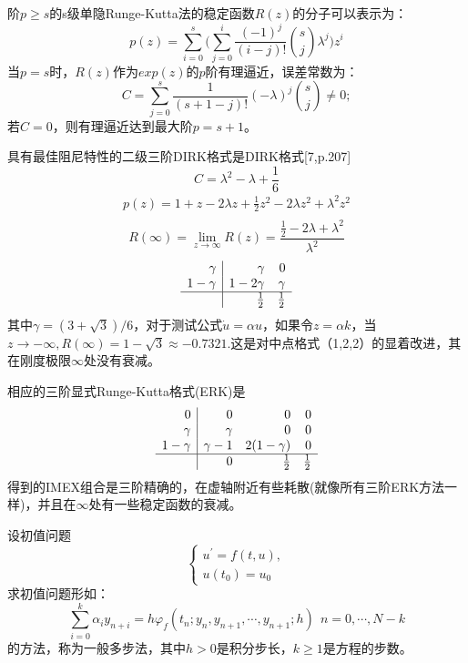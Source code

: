 \documentclass[12pt,a4paper]{article}
\numberwithin{equation}{section}
\begin{document}
阶$p\ge s$的s级单隐Runge-Kutta法的稳定函数$R(z)$的分子可以表示为：
\begin{equation*}
p(z)=\sum_{i=0}^{s}\bigg(\sum_{j=0}^{i}\frac{(-1)^j}{(i-j)!}\binom{s}{j}\lambda^j\biggl)z^i
\end{equation*}
当$p=s$时，$R(z)$作为$exp(z)$的$p$阶有理逼近，误差常数为：
\begin{equation*}
C=\sum_{j=0}^{s}\frac{1}{(s+1-j)!}(-\lambda)^j\binom{s}{j}\ne 0;
\end{equation*}
若$C=0$，则有理逼近达到最大阶$p=s+1$。

具有最佳阻尼特性的二级三阶DIRK格式是DIRK格式[7,p.207]
\begin{equation*}
C=\lambda^2-\lambda+\frac{1}{6}
\end{equation*}
\begin{gather*}
p(z)=1+z-2\lambda z+\frac{1}{2}z^2-2\lambda z^2+\lambda^2z^2\\
\end{gather*}
\begin{equation*}
R(\infty)=\lim\limits_{z\to \infty}R(z)=\frac{\frac{1}{2}-2\lambda+\lambda^2}{\lambda^2}
\end{equation*}
\[
\begin{array}{r|rr}
\gamma & \gamma & 0 \\
1-\gamma & 1-2\gamma & \gamma  \\
\hline
& \frac{1}{2} & \frac{1}{2}
\end{array}
\]
其中$\gamma=(3+\sqrt{3})/6$，对于测试公式$\dot{u}=\alpha u$，如果令$z=\alpha k$，当$z\to -\infty,R(\infty)=1-\sqrt{3}\approx -0.7321.$这是对中点格式（1,2,2）的显着改进，其在刚度极限$\infty$处没有衰减。

相应的三阶显式Runge-Kutta格式(ERK)是
\[
\begin{array}{r|rrr}
0 & 0 & 0 & 0\\
\gamma & \gamma & 0 & 0\\
1-\gamma & \gamma -1 & 2(1-\gamma ) & 0\\
\hline
& 0 & \frac{1}{2} & \frac{1}{2}
\end{array}
\]
得到的IMEX组合是三阶精确的，在虚轴附近有些耗散(就像所有三阶ERK方法一样)，并且在$\infty$处有一些稳定函数的衰减。

设初值问题
\begin{equation*}
\begin{cases}
u^{'}=f(t,u),\\
u(t_{0})=u_{0}
\end{cases}
\end{equation*}
求初值问题形如：
\begin{equation}
\sum_{i=0}^{k}\alpha_{i}y_{n+i}=h\varphi_{f}(t_{n};y_{n},y_{n+1},\cdots,y_{n+1};h)~~n=0,\cdots,N-k
\label{27}
\end{equation}
的方法，称为一般多步法，其中$h>0$是积分步长，$k\ge 1$是方程的步数。
\end{document}
